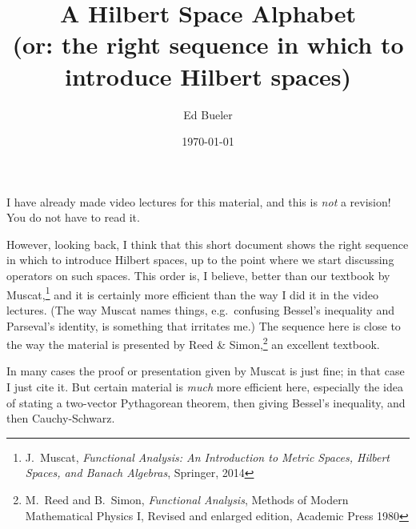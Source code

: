 \documentclass[11pt]{article}
\title{A Hilbert Space Alphabet \\ (or: the right sequence in which to introduce Hilbert spaces)}
\author{Ed Bueler}
\date{\today}
\begin{document}
\maketitle

I have already made video lectures for this material, and this is \emph{not} a revision!  You do not have to read it.

However, looking back, I think that this short document shows the right sequence in which to introduce Hilbert spaces, up to the point where we start discussing operators on such spaces.  This order is, I believe, better than our textbook by Muscat,\footnote{J.~Muscat, \emph{Functional Analysis: An Introduction to Metric Spaces, Hilbert Spaces, and Banach Algebras}, Springer, 2014} and it is certainly more efficient than the way I did it in the video lectures.  (The way Muscat names things, e.g.~confusing Bessel's inequality and Parseval's identity, is something that irritates me.)  The sequence here is close to the way the material is presented by Reed \& Simon,\footnote{M.~Reed and B.~Simon, \emph{Functional Analysis}, Methods of Modern Mathematical Physics I, Revised and enlarged edition, Academic Press 1980} an excellent textbook.

In many cases the proof or presentation given by Muscat is just fine; in that case I just cite it.  But certain material is \emph{much} more efficient here, especially the idea of stating a two-vector Pythagorean theorem, then giving Bessel's  inequality, and then Cauchy-Schwarz.

\vspace{0.5in}
\end{document}
